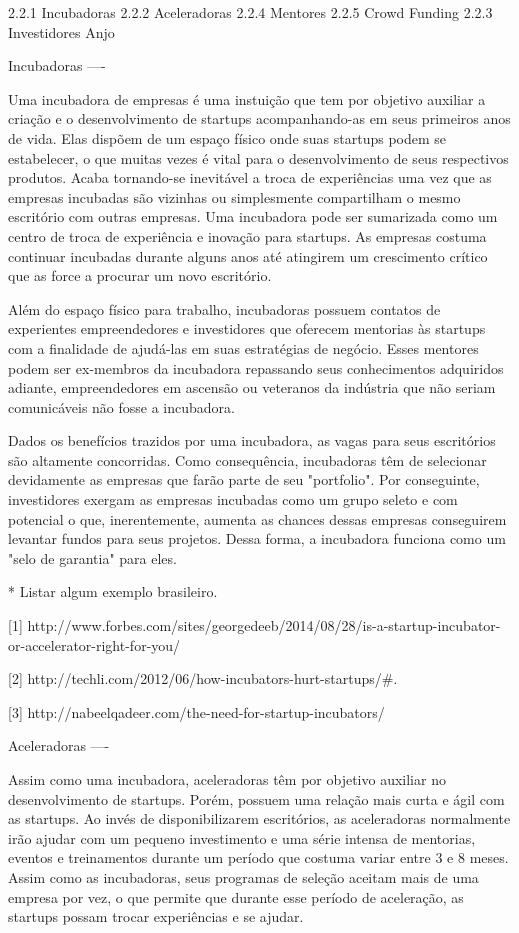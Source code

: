 2.2.1 Incubadoras
2.2.2 Aceleradoras
2.2.4 Mentores
2.2.5 Crowd Funding
2.2.3 Investidores Anjo

Incubadoras
----

Uma incubadora de empresas é uma instuição que tem por objetivo auxiliar a criação e o desenvolvimento de startups acompanhando-as em seus primeiros anos de vida. Elas dispõem de um espaço físico onde suas startups podem se estabelecer, o que muitas vezes é vital para o desenvolvimento de seus respectivos produtos. Acaba tornando-se inevitável a troca de experiências uma vez que as empresas incubadas são vizinhas ou simplesmente compartilham o mesmo escritório com outras empresas. Uma incubadora pode ser sumarizada como um centro de troca de experiência e inovação para startups. As empresas costuma continuar incubadas durante alguns anos até atingirem um crescimento crítico que as force a procurar um novo escritório.

Além do espaço físico para trabalho, incubadoras possuem contatos de experientes empreendedores e investidores que oferecem mentorias às startups com a finalidade de ajudá-las em suas estratégias de negócio. Esses mentores podem ser ex-membros da incubadora repassando seus conhecimentos adquiridos adiante, empreendedores em ascensão ou veteranos da indústria que não seriam comunicáveis não fosse a incubadora.

Dados os benefícios trazidos por uma incubadora, as vagas para seus escritórios são altamente concorridas. Como consequência, incubadoras têm de selecionar devidamente as empresas que farão parte de seu "portfolio". Por conseguinte, investidores exergam as empresas incubadas como um grupo seleto e com potencial o que, inerentemente, aumenta as chances dessas empresas conseguirem levantar fundos para seus projetos. Dessa forma, a incubadora funciona como um "selo de garantia" para eles.

* Listar algum exemplo brasileiro.

[1]
http://www.forbes.com/sites/georgedeeb/2014/08/28/is-a-startup-incubator-or-accelerator-right-for-you/

[2]
http://techli.com/2012/06/how-incubators-hurt-startups/#.

[3]
http://nabeelqadeer.com/the-need-for-startup-incubators/


Aceleradoras
----

Assim como uma incubadora, aceleradoras têm por objetivo auxiliar no desenvolvimento de startups. Porém, possuem uma relação mais curta e ágil com as startups. Ao invés de disponibilizarem escritórios, as aceleradoras normalmente irão ajudar com um pequeno investimento e uma série intensa de mentorias, eventos e treinamentos durante um período que costuma variar entre 3 e 8 meses. Assim como as incubadoras, seus programas de seleção aceitam mais de uma empresa por vez, o que permite que durante esse período de aceleração, as startups possam trocar experiências e se ajudar.

